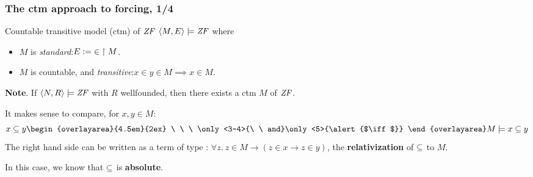 \documentclass[english]{beamer}
\begin{document}
\begin{frame}
  \frametitle{The ctm approach to forcing, 1/4}
  \begin{block}{Countable transitive model (ctm) of $\mathit{ZF}$}
    $\langle M, E\rangle \models \mathit{ZF}$ where
    \begin{itemize}
    \item \alert<3>{$M$ is \emph{standard}:\quad $E \mathrel{\mathop:}= {\in}\restriction M$.}
    \item $M$ is countable, and \emph{transitive}:\quad $x\in y \in M \implies x\in M$.
    \end{itemize}
  \end{block}
  \pause%
  \textbf{Note}. If $\langle N, R\rangle \models \mathit{ZF}$ with $R$ wellfounded, then there
  exists a ctm $M$ of $\mathit{ZF}$.
  \pause

  It makes sense to compare, for $x,y\in M$:
  \[
  x \sbq y
  \begin{overlayarea}{4.5em}{2ex}
    \ \ \ \only<3-4>{\ \  and}\only<5>{\alert{$\iff$}}
  \end{overlayarea}
  M \models x\sbq y
  \]
  \pause
  The right hand side can be written as a term of type :
  $\forall z.\ z\in M \longrightarrow (z\in x \longrightarrow z\in
  y)$,
  the \textbf{relativization} of $\subseteq$ to $M$. 
  \pause

  In this case, we know that  $\subseteq$  is \textbf{absolute}.
\end{frame}
\end{document}
